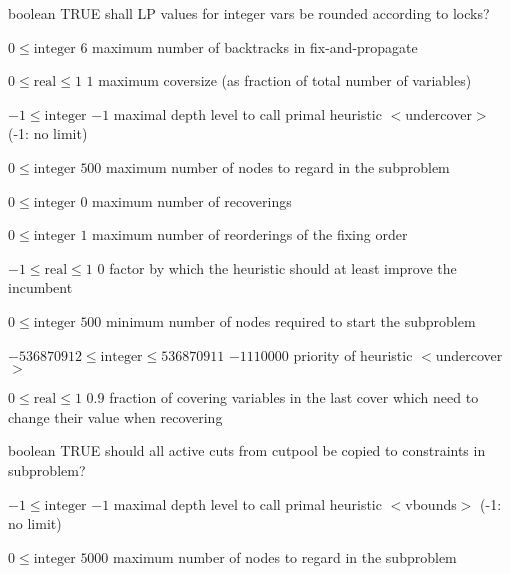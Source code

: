 %
{boolean}%
{TRUE}%
{shall LP values for integer vars be rounded according to locks?}%
{}

%
{$0\leq\textrm{integer}$}%
{$6$}%
{maximum number of backtracks in fix-and-propagate}%
{}

%
{$0\leq\textrm{real}\leq1$}%
{$1$}%
{maximum coversize (as fraction of total number of variables)}%
{}

%
{$-1\leq\textrm{integer}$}%
{$-1$}%
{maximal depth level to call primal heuristic $<$undercover$>$ (-1: no limit)}%
{}

%
{$0\leq\textrm{integer}$}%
{$500$}%
{maximum number of nodes to regard in the subproblem}%
{}

%
{$0\leq\textrm{integer}$}%
{$0$}%
{maximum number of recoverings}%
{}

%
{$0\leq\textrm{integer}$}%
{$1$}%
{maximum number of reorderings of the fixing order}%
{}

%
{$-1\leq\textrm{real}\leq1$}%
{$0$}%
{factor by which the heuristic should at least improve the incumbent}%
{}

%
{$0\leq\textrm{integer}$}%
{$500$}%
{minimum number of nodes required to start the subproblem}%
{}

%
{$-536870912\leq\textrm{integer}\leq536870911$}%
{$-1110000$}%
{priority of heuristic $<$undercover$>$}%
{}

%
{$0\leq\textrm{real}\leq1$}%
{$0.9$}%
{fraction of covering variables in the last cover which need to change their value when recovering}%
{}

%
{boolean}%
{TRUE}%
{should all active cuts from cutpool be copied to constraints in subproblem?}%
{}

%
{$-1\leq\textrm{integer}$}%
{$-1$}%
{maximal depth level to call primal heuristic $<$vbounds$>$ (-1: no limit)}%
{}

%
{$0\leq\textrm{integer}$}%
{$5000$}%
{maximum number of nodes to regard in the subproblem}%
{}

